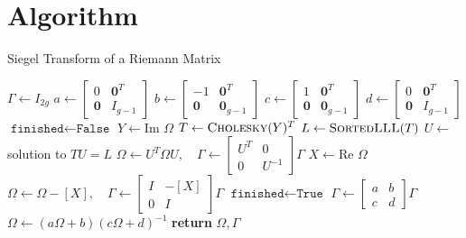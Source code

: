 \documentclass[12]{article}
\begin{document}
\section{Algorithm}

\begin{algorithm}
\caption{Siegel Transform of a Riemann Matrix}
\label{alg: siegel}
\begin{algorithmic}

  \State $\Gamma \gets I_{2g}$
  \State $a \gets \left[ \begin{smallmatrix} 0 & \mathbf{0}^T \\
      \mathbf{0} & I_{g-1} \end{smallmatrix} \right]$
  \State $b \gets \left[ \begin{smallmatrix} -1 & \mathbf{0}^T \\
      \mathbf{0} & \mathbf{0}_{g-1} \end{smallmatrix} \right]$
  \State $c \gets \left[ \begin{smallmatrix} 1 & \mathbf{0}^T \\
      \mathbf{0} & \mathbf{0}_{g-1} \end{smallmatrix} \right]$
  \State $d \gets \left[ \begin{smallmatrix} 0 & \mathbf{0}^T \\
      \mathbf{0} & I_{g-1} \end{smallmatrix} \right]$
  \State $\texttt{finished} \gets \texttt{False}$
    \State $Y \gets \text{Im } \Omega$
    \State $T \gets \textsc{Cholesky}(Y)^T$
    \State $L \gets \textsc{SortedLLL}(T)$
    \State $U \gets$ solution to $TU = L$
    \State $\Omega \gets U^T \Omega U, \quad \Gamma \gets \left[
      \begin{smallmatrix} U^T & 0 \\ 0 & U^{-1} \end{smallmatrix}
      \right] \Gamma$
    \State $X \gets \text{Re } \Omega$
    \State $\Omega \gets \Omega - [X], \quad \Gamma \gets \left[
      \begin{smallmatrix} I & -[X] \\ 0 & I \end{smallmatrix}
      \right] \Gamma$
      \State $\texttt{finished} \gets \texttt{True}$
    \Else
      \State $\Gamma \gets \left[
        \begin{smallmatrix} a & b \\ c & d \end{smallmatrix}
        \right] \Gamma$
      \State $\Omega \gets (a\Omega + b)(c \Omega + d)^{-1}$
    \EndIf
  \EndWhile
  \State \textbf{return} $\Omega, \Gamma$
\EndProcedure
\end{algorithmic}
\end{algorithm}
\end{document}

